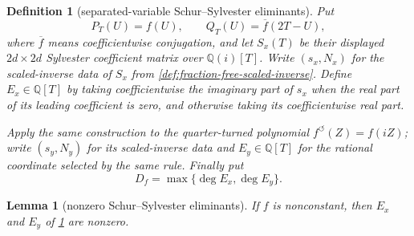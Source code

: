 \documentclass[11pt]{article}
\newtheorem{lemma}[theorem]{Lemma}
\newtheorem{definition}[theorem]{Definition}
\newcommand{\Qi}{\mathbb{Q}(i)}
\newcommand{\Q}{\mathbb{Q}}
\begin{document}
\begin{definition}[separated-variable Schur--Sylvester eliminants]
\label{def:axis-eliminants}
Put
\[
       P_T(U)=f(U),\qquad Q_T(U)=\overline f(2T-U),
\]
where $\overline f$ means coefficientwise conjugation, and let $S_x(T)$ be
their displayed $2d\times2d$ Sylvester coefficient matrix over $\Qi[T]$.
Write $(s_x,N_x)$ for the scaled-inverse data of $S_x$ from
\cref{def:fraction-free-scaled-inverse}.  Define $E_x\in\Q[T]$ by taking
coefficientwise the imaginary part of $s_x$ when the real part of its
leading coefficient is zero, and otherwise taking its coefficientwise real
part.

Apply the same construction to the quarter-turned polynomial
$f^{\circlearrowleft}(Z)=f(iZ)$; write $(s_y,N_y)$ for its scaled-inverse
data and $E_y\in\Q[T]$ for the rational coordinate selected by the same
rule.  Finally put
\[
             D_f=\max\{\deg E_x,\deg E_y\}.
\]
\end{definition}

\begin{lemma}[nonzero Schur--Sylvester eliminants]
\label{lem:eliminant-nonzero}
If $f$ is nonconstant, then $E_x$ and $E_y$ of
\cref{def:axis-eliminants} are nonzero.
\end{lemma}
\end{document}
